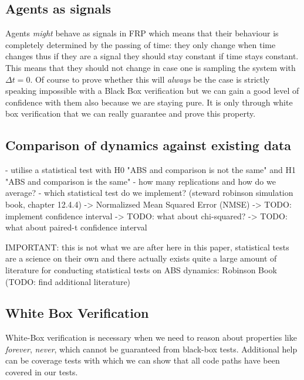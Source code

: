 \subsection{Agents as signals}
Agents \textit{might} behave as signals in FRP which means that their behaviour is completely determined by the passing of time: they only change when time changes thus if they are a signal they should stay constant if time stays constant. This means that they should not change in case one is sampling the system with $\Delta t = 0$. Of course to prove whether this will \textit{always} be the case is strictly speaking impossible with a Black Box verification but we can gain a good level of confidence with them also because we are staying pure. It is only through white box verification that we can really guarantee and prove this property.

\subsection{Comparison of dynamics against existing data}
- utilise a statistical test with H0 "ABS and comparison is not the same" and H1 "ABS and comparison is the same"
- how many replications and how do we average?
- which statistical test do we implement? (steward robinson simulation book, chapter 12.4.4)
	-> Normalizsed Mean Squared Error (NMSE)
	-> TODO: implement confidence interval 
	-> TODO: what about chi-squared?
	-> TODO: what about paired-t confidence interval

IMPORTANT: this is not what we are after here in this paper, statistical tests are a science on their own and there actually exists quite a large amount of literature for conducting statistical tests on ABS dynamics: Robinson Book (TODO: find additional literature)	

\subsection{White Box Verification}
White-Box verification is necessary when we need to reason about properties like \textit{forever}, \textit{never}, which cannot be guaranteed from black-box tests. Additional help can be coverage tests with which we can show that all code paths have been covered in our tests.